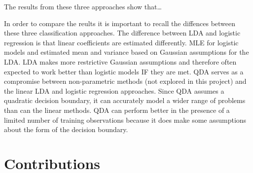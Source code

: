 \documentclass[]{article}
\begin{document}
The results from these three approaches show that\ldots{}

In order to compare the reults it is important to recall the diffences
between these three classification approaches. The difference between
LDA and logistic regression is that linear coefficients are estimated
differently. MLE for logistic models and estimated mean and variance
based on Gaussian assumptions for the LDA. LDA makes more restrictive
Gaussian assumptions and therefore often expected to work better than
logistic models IF they are met. QDA serves as a compromise between
non-parametric methods (not explored in this project) and the linear LDA
and logistic regression approaches. Since QDA assumes a quadratic
decision boundary, it can accurately model a wider range of problems
than can the linear methods. QDA can perform better in the presence of a
limited number of training observations because it does make some
assumptions about the form of the decision boundary.

\section{Contributions}\label{contributions}
\end{document}
